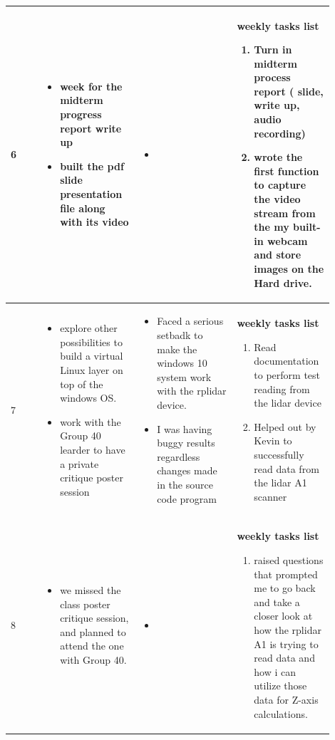 \documentclass[10pt,draftclsnofoot,onecolumn,journal,compsoc]{IEEEtran}
\begin{document}
\begin{singlespace}
\begin{longtable}{|l|p{0.3\linewidth}|p{0.3\linewidth}|p{0.3\linewidth}|}
		6	&
\begin{itemize}
\item week for the midterm progress report write up
\item built the pdf slide presentation file along with its video
\end{itemize}
			&
\begin{itemize}
\item 
\end{itemize}
			&
			\textbf{ weekly tasks list}
\begin{enumerate}
\item 	Turn in midterm process report ( slide, write up, audio recording)
\item wrote the first function to capture the video stream from the my built-in webcam and store images on the Hard drive.
\end{enumerate}
			\\\hline

		7	&
\begin{itemize}
\item explore other possibilities to build a virtual Linux layer on top of the windows OS.
\item work with the Group 40 learder to have a private critique poster session
\end{itemize}
			&
\begin{itemize}
\item Faced a serious setbadk to make the windows 10 system work with the rplidar device. 
\item I was having buggy results regardless changes made in the source code program
\end{itemize}
			&
			\textbf{ weekly tasks list}
\begin{enumerate}

\item Read documentation to perform test reading from the lidar device
\item Helped out by Kevin to successfully read data from the  lidar A1 scanner
\end{enumerate}

			\\\hline

		8	&
\begin{itemize}
\item we missed the class poster critique session, and planned to attend the one with Group 40.
\end{itemize}
			&
\begin{itemize}
\item 
\end{itemize}
			&
			\textbf{ weekly tasks list}
\begin{enumerate}
\item raised questions that prompted me to go back and take a closer look at how the rplidar A1  is trying to read data and how i can utilize those data for Z-axis calculations.
\end{enumerate}
			

\end{longtable}
\end{singlespace}
\end{document}
